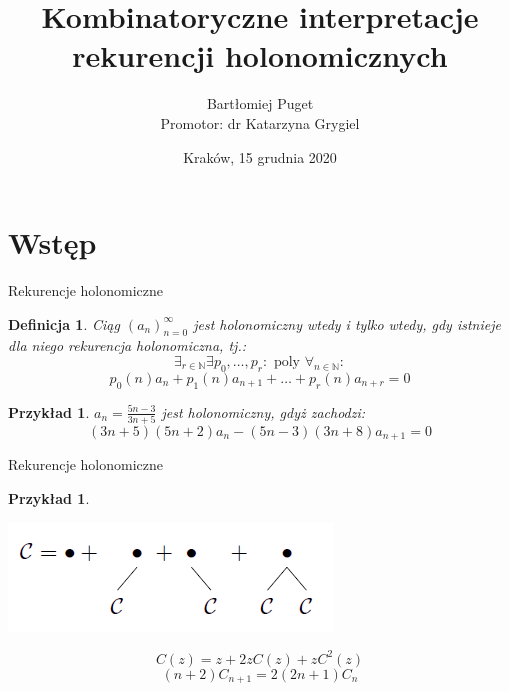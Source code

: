 \documentclass[final]{beamer}
\title{Kombinatoryczne interpretacje rekurencji holonomicznych}
\author[Bartłomiej Puget (TCS UJ)]{Bartłomiej Puget\\Promotor: dr Katarzyna Grygiel}
\institute{Theoretical Computer Science\\Jagiellonian University}
\date{Kraków, 15 grudnia 2020}
\theoremstyle{bluetheorem}
\theoremstyle{bluetheorem}
\newtheorem{mydefinition}[mytheorem]{Definicja}
\theoremstyle{greentheorem}
\newtheorem{myexample}[mytheorem]{Przykład}
\begin{document}
\maketitle

\section{Wstęp}

\begin{frame}{Rekurencje holonomiczne}
    \begin{mydefinition}
        Ciąg \((a_n)_{n=0}^\infty\) jest holonomiczny wtedy i tylko wtedy, gdy istnieje dla niego rekurencja holonomiczna, tj.:
        \[\exists_{r \in \mathbb{N}} \exists {p_0, \ldots, p_r : \text{ poly }}\forall_{n \in \mathbb{N}}:\]
        \[p_0(n) a_n + p_1(n) a_{n + 1} + \ldots + p_r(n) a_{n + r} = 0\]
    \end{mydefinition}

    \begin{myexample}
        \(a_n = \frac{5 n - 3}{3 n + 5}\) jest holonomiczny, gdyż zachodzi:
        \[(3n + 5) (5n + 2) a_n - (5n - 3)(3n + 8) a_{n + 1} = 0\]
    \end{myexample}
\end{frame}

\begin{frame}{Rekurencje holonomiczne}
    \begin{myexample}
        \begin{center}
            \includegraphics[width=.5\textwidth]{catalan_image.png}
        \end{center}
        \[C(z) = z + 2 z C(z) + z C^2(z)\]
        \[(n + 2) C_{n + 1} = 2(2n + 1) C_n \]
    \end{myexample}
\end{frame}
\end{document}
